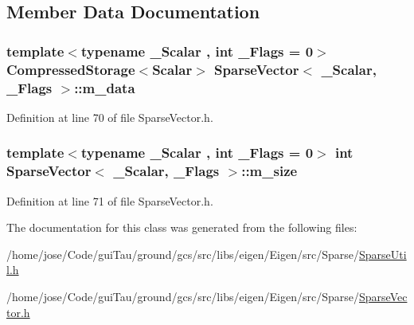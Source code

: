 \subsection{Member Data Documentation}
\hypertarget{class_sparse_vector_ad111f906cd22fea7a5e8fe3c19d855bf}{
\subsubsection[{m\-\_\-data}]{\setlength{\rightskip}{0pt plus 5cm}template$<$typename \-\_\-\-Scalar , int \-\_\-\-Flags = 0$>$ {\bf Compressed\-Storage}$<${\bf Scalar}$>$ {\bf Sparse\-Vector}$<$ \-\_\-\-Scalar, \-\_\-\-Flags $>$\-::m\-\_\-data}}\label{class_sparse_vector_ad111f906cd22fea7a5e8fe3c19d855bf}


Definition at line 70 of file Sparse\-Vector.\-h.

\hypertarget{class_sparse_vector_a57bf4f94a89a405f06238fb994d5fece}{
\subsubsection[{m\-\_\-size}]{\setlength{\rightskip}{0pt plus 5cm}template$<$typename \-\_\-\-Scalar , int \-\_\-\-Flags = 0$>$ {\bf int} {\bf Sparse\-Vector}$<$ \-\_\-\-Scalar, \-\_\-\-Flags $>$\-::m\-\_\-size}}\label{class_sparse_vector_a57bf4f94a89a405f06238fb994d5fece}


Definition at line 71 of file Sparse\-Vector.\-h.



The documentation for this class was generated from the following files\-:\begin{DoxyCompactItemize}
\item 
/home/jose/\-Code/gui\-Tau/ground/gcs/src/libs/eigen/\-Eigen/src/\-Sparse/\hyperlink{_sparse_util_8h}{Sparse\-Util.\-h}\item 
/home/jose/\-Code/gui\-Tau/ground/gcs/src/libs/eigen/\-Eigen/src/\-Sparse/\hyperlink{_sparse_vector_8h}{Sparse\-Vector.\-h}\end{DoxyCompactItemize}
